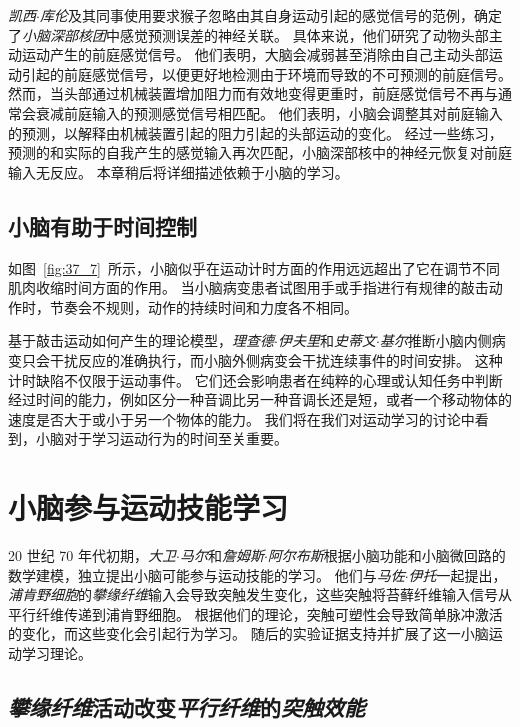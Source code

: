 \textit{凯西$\cdot$库伦}及其同事使用要求猴子忽略由其自身运动引起的感觉信号的范例，确定了\textit{小脑深部核团}中感觉预测误差的神经关联。
具体来说，他们研究了动物头部主动运动产生的前庭感觉信号。
他们表明，大脑会减弱甚至消除由自己主动头部运动引起的前庭感觉信号，以便更好地检测由于环境而导致的不可预测的前庭信号。
然而，当头部通过机械装置增加阻力而有效地变得更重时，前庭感觉信号不再与通常会衰减前庭输入的预测感觉信号相匹配。
他们表明，小脑会调整其对前庭输入的预测，以解释由机械装置引起的阻力引起的头部运动的变化。
经过一些练习，预测的和实际的自我产生的感觉输入再次匹配，小脑深部核中的神经元恢复对前庭输入无反应。
本章稍后将详细描述依赖于小脑的学习。



\subsection{小脑有助于时间控制}

如图~\ref{fig:37_7}~所示，小脑似乎在运动计时方面的作用远远超出了它在调节不同肌肉收缩时间方面的作用。
当小脑病变患者试图用手或手指进行有规律的敲击动作时，节奏会不规则，动作的持续时间和力度各不相同。


基于敲击运动如何产生的理论模型，\textit{理查德$\cdot$伊夫里}和\textit{史蒂文$\cdot$基尔}推断小脑内侧病变只会干扰反应的准确执行，而小脑外侧病变会干扰连续事件的时间安排。
这种计时缺陷不仅限于运动事件。
它们还会影响患者在纯粹的心理或认知任务中判断经过时间的能力，例如区分一种音调比另一种音调长还是短，或者一个移动物体的速度是否大于或小于另一个物体的能力。
我们将在我们对运动学习的讨论中看到，小脑对于学习运动行为的时间至关重要。



\section{小脑参与运动技能学习}

20 世纪 70 年代初期，\textit{大卫$\cdot$马尔}和\textit{詹姆斯$\cdot$阿尔布斯}根据小脑功能和小脑微回路的数学建模，独立提出小脑可能参与运动技能的学习。
他们与\textit{马佐$\cdot$伊托}一起提出，\textit{浦肯野细胞}的\textit{攀缘纤维}输入会导致突触发生变化，这些突触将苔藓纤维输入信号从平行纤维传递到浦肯野细胞。
根据他们的理论，突触可塑性会导致简单脉冲激活的变化，而这些变化会引起行为学习。
随后的实验证据支持并扩展了这一小脑运动学习理论。



\subsection{\textit{攀缘纤维}活动改变\textit{平行纤维}的\textit{突触效能}}


